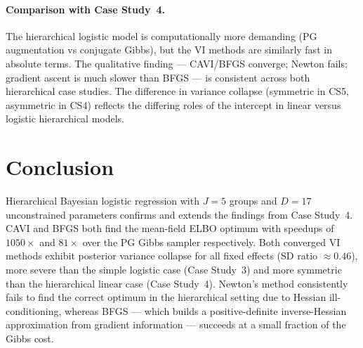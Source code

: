 \documentclass[11pt,a4paper]{article}
\begin{document}
\paragraph{Comparison with Case Study~4.}
The hierarchical logistic model is computationally more demanding (PG augmentation
vs conjugate Gibbs), but the VI methods are similarly fast in absolute terms.
The qualitative finding --- CAVI/BFGS converge; Newton fails; gradient ascent is
much slower than BFGS --- is consistent across both hierarchical case studies.
The difference in variance collapse (symmetric in CS5, asymmetric in CS4) reflects the
differing roles of the intercept in linear versus logistic hierarchical models.

\section{Conclusion}

Hierarchical Bayesian logistic regression with $J=5$ groups and $D=17$ unconstrained
parameters confirms and extends the findings from Case Study~4.
CAVI and BFGS both find the mean-field ELBO optimum with speedups of
$1050\times$ and $81\times$ over the PG Gibbs sampler respectively.
Both converged VI methods exhibit posterior variance collapse for all fixed effects
(SD ratio $\approx 0.46$), more severe than the simple logistic case (Case Study~3)
and more symmetric than the hierarchical linear case (Case Study~4).
Newton's method consistently fails to find the correct optimum in the hierarchical
setting due to Hessian ill-conditioning, whereas BFGS --- which builds a positive-definite
inverse-Hessian approximation from gradient information --- succeeds at a small fraction
of the Gibbs cost.

\nocite{*}
\printbibliography
\end{document}
